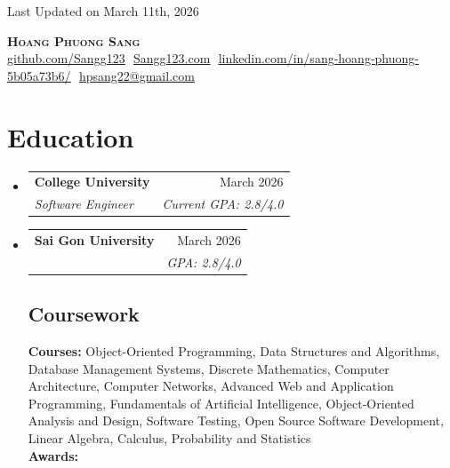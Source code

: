 \documentclass[letterpaper,11pt]{article}
\makeatletter
\newcommand{\resumeSubheading}[4]{
  \vspace{-2pt}\item
    \begin{tabular*}{0.97\textwidth}[t]{l@{\extracolsep{\fill}}r}
      \textbf{#1} & #2 \\
      \textit{\small#3} & \textit{\small #4} \\
    \end{tabular*}\vspace{-7pt}
}
\newcommand{\resumeSubHeadingListStart}{\begin{itemize}[leftmargin=0.15in, label={}]}
\newcommand{\resumeSubHeadingListEnd}{\end{itemize}}
\makeatother
\begin{document}
\begin{flushright}
  \color{gray}
  \item
  Last Updated on March 11th, 2026
\end{flushright}

\vspace{-5pt}

\begin{center}
    \textbf{\Huge \scshape Hoang Phuong Sang} \\ \vspace{8pt}
    \small 
    \href{https://github.com/Sangg123}{\underline{github.com/Sangg123}} $  $
    \href{https://www.Sangg123.com}
    {\underline{Sangg123.com}} $  $
    \href{https://www.linkedin.com/in/sang-ho%C3%A0ng-ph%C6%B0%C6%A1ng-5b05a73b6/}{\underline{linkedin.com/in/sang-hoang-phuong-5b05a73b6/}} $  $
    \href{mailto:hpsang22@gmail.com}
    {\underline{hpsang22@gmail.com}}
\end{center}

\section{Education}
  \resumeSubHeadingListStart
  
    \resumeSubheading
      {College University}{March 2026}
      {Software Engineer}{Current GPA: 2.8/4.0}
      
    \resumeSubheading
      {Sai Gon University }{March 2026}
      {}{GPA: 2.8/4.0}

    \vspace{-10pt}

    \subsection{Coursework}
      \textbf{Courses:} Object-Oriented Programming, Data Structures and Algorithms, Database Management Systems, Discrete Mathematics, Computer Architecture, Computer Networks, Advanced Web and Application Programming, Fundamentals of Artificial Intelligence, Object-Oriented Analysis and Design, Software Testing, Open Source Software Development, Linear Algebra, Calculus, Probability and Statistics \\
      \textbf{Awards:}

  \resumeSubHeadingListEnd
\end{document}

